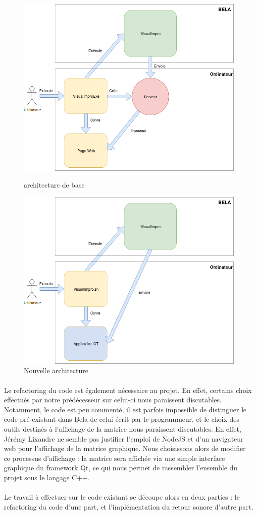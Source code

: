 \begin{figure}[H]
 \centering
 \includegraphics[scale=0.5]{assets/serveurGraph.png}
 \caption{architecture de base}
 \label{schéma global}
 
 
 \includegraphics[scale=0.5]{assets/GUIRefeactored.png}
 \caption{Nouvelle architecture}
 \label{schéma global}
\end{figure}
\newpage

\paragraph{}
Le refactoring du code est également nécessaire au projet. En effet,
certains choix effectués par notre prédécesseur sur celui-ci nous
paraissent discutables. Notamment, le code est peu commenté, il est
parfois impossible de distinguer le code pré-existant dans Bela de
celui écrit par le programmeur, et le choix des outils destinés à
l'affichage de la matrice nous paraissent discutables. En effet,
Jérémy Lixandre ne semble pas justifier l'emploi de NodeJS et d'un
navigateur web pour l'affichage de la matrice graphique. Nous
choisissons alors de modifier ce processus d'affichage : la matrice
sera affichée via une simple interface graphique du framework Qt, ce
qui nous permet de rassembler l'ensemble du projet sous le langage
C++.
\paragraph{}
Le travail à effectuer sur le code existant se découpe alors en deux
parties : le refactoring du code d'une part, et l'implémentation du
retour sonore d'autre part.
